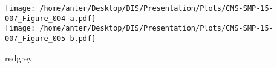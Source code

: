 \documentclass{beamer}
\begin{document}
\begin{frame}
\begin{minipage}[thbp]{0.6\textwidth}
\begin{itemize}
\end{itemize}
\end{minipage}
\hspace{5mm}
\begin{minipage}[thbp]{0.1\textwidth}
\vspace{-1.2mm}
\texttt{[image: /home/anter/Desktop/DIS/Presentation/Plots/CMS-SMP-15-007\_Figure\_004-a.pdf]}\\
\texttt{[image: /home/anter/Desktop/DIS/Presentation/Plots/CMS-SMP-15-007\_Figure\_005-b.pdf]}\\
\hspace*{10mm}\begin{beamercolorbox}[wd=23mm,ht=1mm,center,shadow=true, rounded=true]{redgrey}
{}
{\scalebox {0.61} {}}
\end{beamercolorbox}
\end{minipage}
\end{frame}
\end{document}
